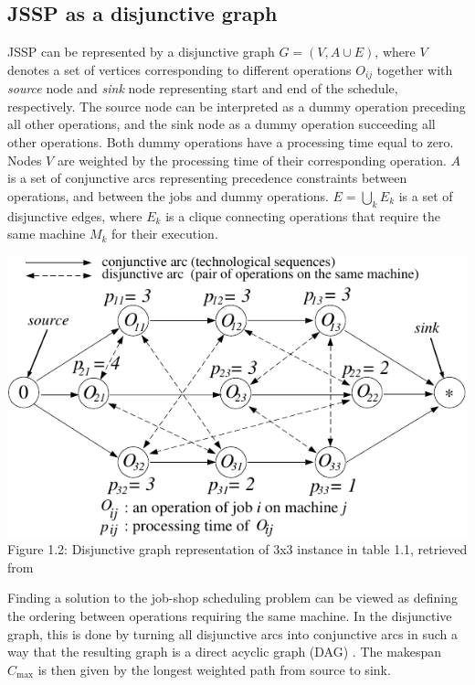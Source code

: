 \subsection{JSSP as a disjunctive graph} \label{JSSP as a disjunctive graph}

JSSP can be represented by a disjunctive graph \cite{YamadaNakanoJSSP, BLAZEWICZ2000317} $G = ( V, A \cup E )$, where $V$ denotes a set of vertices corresponding to different operations $O_{ij}$ together with \textit{source} node and \textit{sink} node representing start and end of the schedule, respectively. The source node can be interpreted as a dummy operation preceding all other operations, and the sink node as a dummy operation succeeding all other operations. Both dummy operations have a processing time equal to zero. Nodes $V$ are weighted by the processing time of their corresponding operation. $A$ is a set of conjunctive arcs representing precedence constraints between operations, and between the jobs and dummy operations. $E = \bigcup_{k} E_k$ is a set of disjunctive edges, where $E_k$ is a clique connecting operations that require the same machine $M_k$ for their execution.
\begin{center}
    \includegraphics[width=0.75\linewidth]{images/jssp_disjunctive_graph.pdf}\\
    Figure 1.2: Disjunctive graph representation of 3x3 instance in table 1.1, retrieved from \cite{YamadaNakanoJSSP}
\end{center}

Finding a solution to the job-shop scheduling problem can be viewed as defining the ordering between operations requiring the same machine. In the disjunctive graph, this is done by turning all disjunctive arcs into conjunctive arcs \cite{YamadaNakanoJSSP, BLAZEWICZ2000317} in such a way that the resulting graph is a direct acyclic graph (DAG) \cite{doi:10.1287/opre.17.6.941}. The makespan $C_\text{max}$ is then given by the longest weighted path from source to sink.

